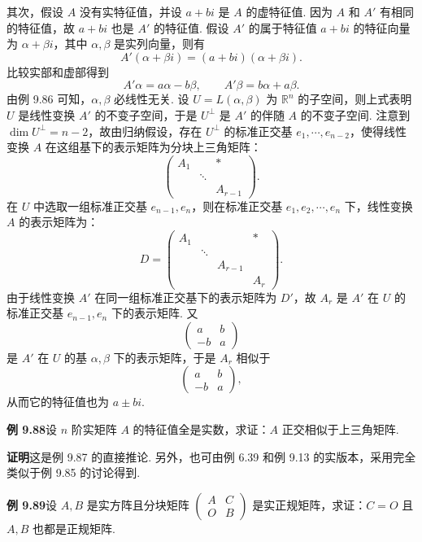 \documentclass[UTF8, 12pt, fontset=fandol, oneside]{ctexart}
\begin{document}
其次，假设 $A$ 没有实特征值，并设 $a+bi$ 是 $A$ 的虚特征值. 因为 $A$ 和 $A'$ 有相同的特征值，故 $a+bi$ 也是 $A'$ 的特征值. 假设 $A'$ 的属于特征值 $a+bi$ 的特征向量为 $\alpha+\beta i$，其中 $\alpha,\beta$ 是实列向量，则有
\[
A'(\alpha+\beta i)=(a+bi)(\alpha+\beta i).
\]
比较实部和虚部得到
\[
A'\alpha=a\alpha-b\beta,\qquad A'\beta=b\alpha+a\beta.
\]
由例 9.86 可知，$\alpha,\beta$ 必线性无关. 设 $U=L(\alpha,\beta)$ 为 $\mathbb{R}^n$ 的子空间，则上式表明 $U$ 是线性变换 $A'$ 的不变子空间，于是 $U^\perp$ 是 $A'$ 的伴随 $A$ 的不变子空间. 注意到 $\dim U^\perp=n-2$，故由归纳假设，存在 $U^\perp$ 的标准正交基 $e_1,\cdots,e_{n-2}$，使得线性变换 $A$ 在这组基下的表示矩阵为分块上三角矩阵：
\[
\begin{pmatrix}
A_1&&*\\
&\ddots&\\
&&A_{r-1}
\end{pmatrix}.
\]
在 $U$ 中选取一组标准正交基 $e_{n-1},e_n$，则在标准正交基 $e_1,e_2,\cdots,e_n$ 下，线性变换 $A$ 的表示矩阵为：
\[
D=\begin{pmatrix}
A_1&&&*\\
&\ddots&&\\
&&A_{r-1}&\\
&&&A_r
\end{pmatrix}.
\]
由于线性变换 $A'$ 在同一组标准正交基下的表示矩阵为 $D'$，故 $A_r$ 是 $A'$ 在 $U$ 的标准正交基 $e_{n-1},e_n$ 下的表示矩阵. 又
\[
\begin{pmatrix}
a&b\\
-b&a
\end{pmatrix}
\]
是 $A'$ 在 $U$ 的基 $\alpha,\beta$ 下的表示矩阵，于是 $A_r$ 相似于
\[
\begin{pmatrix}
a&b\\
-b&a
\end{pmatrix},
\]
从而它的特征值也为 $a\pm bi$.

\noindent\textbf{例 9.88}\quad 设 $n$ 阶实矩阵 $A$ 的特征值全是实数，求证：$A$ 正交相似于上三角矩阵.

\noindent\textbf{证明}\quad 这是例 9.87 的直接推论. 另外，也可由例 6.39 和例 9.13 的实版本，采用完全类似于例 9.85 的讨论得到.

\noindent\textbf{例 9.89}\quad 设 $A,B$ 是实方阵且分块矩阵 $\begin{pmatrix}A&C\\O&B\end{pmatrix}$ 是实正规矩阵，求证：$C=O$ 且 $A,B$ 也都是正规矩阵.
\end{document}
